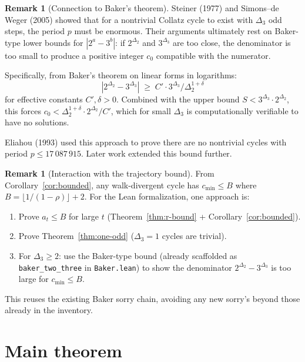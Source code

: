 \documentclass[11pt,a4paper]{article}
\theoremstyle{plain}
\theoremstyle{definition}
\newtheorem{remark}[theorem]{Remark}
\begin{document}
\begin{remark}[Connection to Baker's theorem]
Steiner (1977) and Simons--de Weger (2005) showed that for a nontrivial
Collatz cycle to exist with $\Delta_3$ odd steps, the period $p$ must be
enormous.  Their arguments ultimately rest on Baker-type lower bounds
for $|2^a - 3^b|$: if $2^{\Delta_2}$ and $3^{\Delta_3}$ are too close,
the denominator is too small to produce a positive integer $c_0$
compatible with the numerator.

Specifically, from Baker's theorem on linear forms in logarithms:
\[
  |2^{\Delta_2} - 3^{\Delta_3}|
  \;\ge\;
  C' \cdot 3^{\Delta_3} / \Delta_2^{1+\delta}
\]
for effective constants $C', \delta > 0$.  Combined with the upper
bound $S < 3^{\Delta_3} \cdot 2^{\Delta_2}$, this forces
$c_0 < \Delta_2^{1+\delta} \cdot 2^{\Delta_2} / C'$, which for small
$\Delta_3$ is computationally verifiable to have no solutions.

Eliahou (1993) used this approach to prove there are no nontrivial
cycles with period $p \le 17\,087\,915$.  Later work extended this
bound further.
\end{remark}

\begin{remark}[Interaction with the trajectory bound]
From Corollary~\ref{cor:bounded}, any walk-divergent cycle has
$c_{\min} \le B$ where $B = \lfloor 1/(1-\rho) \rfloor + 2$.
For the Lean formalization, one approach is:
\begin{enumerate}
  \item Prove $a_t \le B$ for large $t$
    (Theorem~\ref{thm:r-bound} + Corollary~\ref{cor:bounded}).
  \item Prove Theorem~\ref{thm:one-odd} ($\Delta_3 = 1$ cycles are
    trivial).
  \item For $\Delta_3 \ge 2$: use the Baker-type bound
    (already scaffolded as \texttt{baker\_two\_three} in
    \texttt{Baker.lean}) to show the denominator
    $2^{\Delta_2} - 3^{\Delta_3}$ is too large for $c_{\min} \le B$.
\end{enumerate}
This reuses the existing Baker sorry chain, avoiding any new sorry's
beyond those already in the inventory.
\end{remark}

\section{Main theorem}
\end{document}
